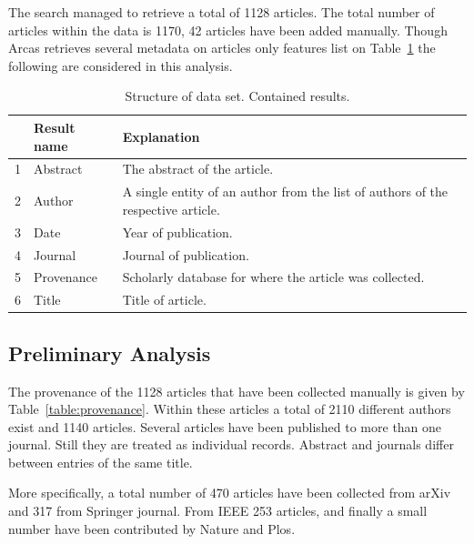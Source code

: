 \documentclass{article}
\begin{document}
The search managed to retrieve a total of 1128 articles. The total number
of articles within the data is 1170, 42 articles have been added manually.
Though Arcas retrieves several metadata on articles only features list on 
Table~\ref{table:result_set} the following are considered in this analysis.

\begin{table}[!hbtp]
    \begin{center}
        \begin{tabular}{lll}
            \toprule
             & Result name & Explanation \\
             \midrule
             1 & Abstract & The abstract of the article.\\ 
             2 & Author & A single entity of an author from the list of 
             authors of the respective article.\\ 
             3 & Date & Year of publication.\\ 
             4 & Journal & Journal of publication.\\               
             5 & Provenance & Scholarly database for where the article was 
             collected.\\                        
             6 & Title & Title of article.\\               
            \bottomrule
        \end{tabular}
    \end{center}
    \caption{Structure of data set. Contained results.}
    \label{table:result_set}
\end{table}

\subsection{Preliminary Analysis}

The provenance of the 1128 articles that have been collected manually is given 
by Table~\ref{table:provenance}. Within these articles a total of 2110 different
authors exist and 1140 articles. Several articles have been published to more 
than one journal. Still they are treated as individual records. Abstract and 
journals differ between entries of the same title.

More specifically, a total number of 470 articles have been collected from arXiv
and 317 from Springer journal. From IEEE 253 articles, and finally a small 
number have been contributed by Nature and Plos.
\end{document}
